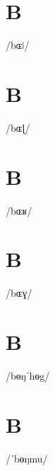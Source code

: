 \documentclass[10pt,a4paper,twoside]{book}
\begin{document}
\section*{B}

\begin{multicols}{3}
 {/bɶǀ/} {}
\end{multicols}

\section*{B}

\begin{multicols}{3}
 {/bɶɭ/} {}
\end{multicols}

\section*{B}

\begin{multicols}{3}
 {/bɶʁ/} {}
\end{multicols}

\section*{B}

\begin{multicols}{3}
 {/bɶɣ/} {}
\end{multicols}

\section*{B}

\begin{multicols}{3}
 {/bɵŋˈhɵg/} {}
\end{multicols}

\section*{B}

\begin{multicols}{3}
 {/ˈbɵŋmu/} {}
\end{multicols}
\end{document}
